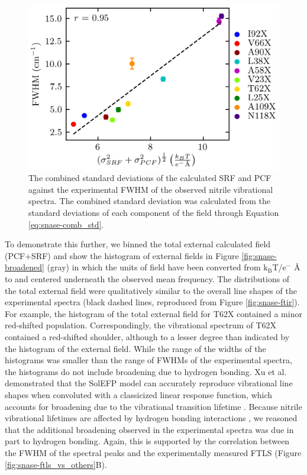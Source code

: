 \begin{figure}
    \center
    \includegraphics[width=\single]{figures-snase/fwhm_vs_std.png}
    \caption[Combined standard deviations of the component fields against the experimental FWHM]{
        The combined standard deviations of the calculated SRF and PCF against the experimental FWHM of the observed nitrile vibrational spectra. 
        The combined standard deviation was calculated from the standard deviations of each component of the field through Equation \ref{eq:snase-comb_std}.
    }
    \label{fig:snase-comb_std}
\end{figure}

To demonstrate this further, we binned the total external calculated field (PCF+SRF) and show the histogram of external fields in Figure \ref{fig:snase-broadened} (gray) in which the units of field have been converted from k$_\text{B}$T/e$^{-}$ \si{\angstrom} to \si{\wn} and centered underneath the observed mean frequency. 
The distributions of the total external field were qualitatively similar to the overall line shapes of the experimental spectra (black dashed lines, reproduced from Figure \ref{fig:snase-ftir}). 
For example, the histogram of the total external field for T62X contained a minor red-shifted population. 
Correspondingly, the vibrational spectrum of T62X contained a red-shifted shoulder, although to a lesser degree than indicated by the histogram of the external field. 
While the range of the widths of the histograms was smaller than the range of FWHMs of the experimental spectra, the histograms do not include broadening due to hydrogen bonding. 
Xu et al. demonstrated that the SolEFP model can accurately reproduce vibrational line shapes when convoluted with a classicized linear response function, which accounts for broadening due to the vibrational transition lifetime \cite{Xu2018}. 
Because nitrile vibrational lifetimes are affected by hydrogen bonding interactions \cite{vanWilderen2014}, we reasoned that the additional broadening observed in the experimental spectra was due in part to hydrogen bonding. 
Again, this is supported by the correlation between the FWHM of the spectral peaks and the experimentally measured FTLS (Figure \ref{fig:snase-ftls_vs_others}B). 

